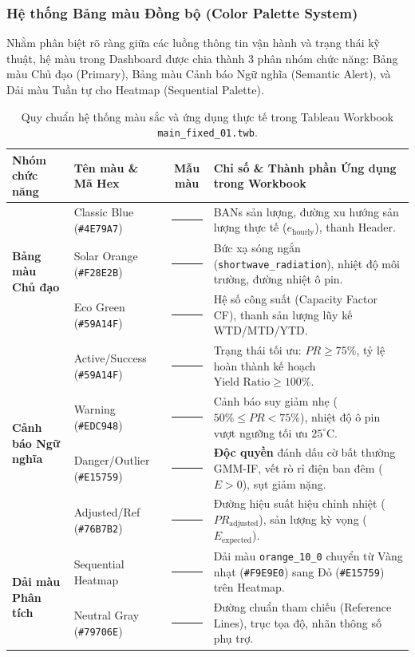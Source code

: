 \documentclass[12pt, a4paper]{report}
\begin{document}
\subsubsection{Hệ thống Bảng màu Đồng bộ (Color Palette System)}

Nhằm phân biệt rõ ràng giữa các luồng thông tin vận hành và trạng thái kỹ thuật, hệ màu trong Dashboard được chia thành 3 phân nhóm chức năng: Bảng màu Chủ đạo (Primary), Bảng màu Cảnh báo Ngữ nghĩa (Semantic Alert), và Dải màu Tuần tự cho Heatmap (Sequential Palette).

\begin{table}[H]
\centering
\small
\renewcommand{\arraystretch}{1.3}
\begin{tabularx}{\textwidth}{@{} l l c X @{}}
\toprule
\textbf{Nhóm chức năng} & \textbf{Tên màu \& Mã Hex} & \textbf{Mẫu màu} & \textbf{Chỉ số \& Thành phần Ứng dụng trong Workbook} \\
\midrule
\multirow{3}{*}{\textbf{Bảng màu Chủ đạo}} 
& Classic Blue (\texttt{\#4E79A7}) & \textcolor{tblNavy}{\rule{1.2cm}{0.3cm}} & BANs sản lượng, đường xu hướng sản lượng thực tế ($e_{\text{hourly}}$), thanh Header. \\
& Solar Orange (\texttt{\#F28E2B}) & \textcolor{tblOrange}{\rule{1.2cm}{0.3cm}} & Bức xạ sóng ngắn (\texttt{shortwave\_radiation}), nhiệt độ môi trường, đường nhiệt ô pin. \\
& Eco Green (\texttt{\#59A14F}) & \textcolor{tblGreen}{\rule{1.2cm}{0.3cm}} & Hệ số công suất (Capacity Factor CF), thanh sản lượng lũy kế WTD/MTD/YTD. \\
\midrule
\multirow{4}{*}{\textbf{Cảnh báo Ngữ nghĩa}}
& Active/Success (\texttt{\#59A14F}) & \textcolor{tblGreen}{\rule{1.2cm}{0.3cm}} & Trạng thái tối ưu: $PR \ge 75\%$, tỷ lệ hoàn thành kế hoạch $\text{Yield Ratio} \ge 100\%$. \\
& Warning (\texttt{\#EDC948}) & \textcolor{tblYellow}{\rule{1.2cm}{0.3cm}} & Cảnh báo suy giảm nhẹ ($50\% \le PR < 75\%$), nhiệt độ ô pin vượt ngưỡng tối ưu $25^\circ\text{C}$. \\
& Danger/Outlier (\texttt{\#E15759}) & \textcolor{tblRed}{\rule{1.2cm}{0.3cm}} & \textbf{Độc quyền} đánh dấu cờ bất thường GMM-IF, vết rò rỉ điện ban đêm ($E > 0$), sụt giảm nặng. \\
& Adjusted/Ref (\texttt{\#76B7B2}) & \textcolor{tblTeal}{\rule{1.2cm}{0.3cm}} & Đường hiệu suất hiệu chỉnh nhiệt ($PR_{\text{adjusted}}$), sản lượng kỳ vọng ($E_{\text{expected}}$). \\
\midrule
\multirow{2}{*}{\textbf{Dải màu Phân tích}}
& Sequential Heatmap & \textcolor{tblSeqWarm}{\rule{1.2cm}{0.3cm}} & Dải màu \texttt{orange\_10\_0} chuyển từ Vàng nhạt (\texttt{\#F9E9E0}) sang Đỏ (\texttt{\#E15759}) trên Heatmap. \\
& Neutral Gray (\texttt{\#79706E}) & \textcolor{tblGray}{\rule{1.2cm}{0.3cm}} & Đường chuẩn tham chiếu (Reference Lines), trục tọa độ, nhãn thông số phụ trợ. \\
\bottomrule
\end{tabularx}
\caption{Quy chuẩn hệ thống màu sắc và ứng dụng thực tế trong Tableau Workbook \texttt{main\_fixed\_01.twb}.}
\label{tab:tableau_color_system}
\end{table}
\end{document}
